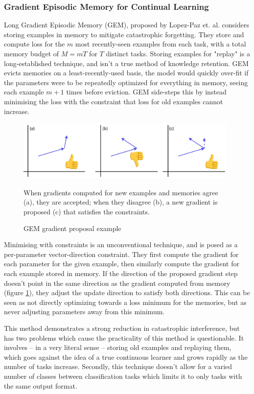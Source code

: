 \documentclass{report}
\begin{document}
	\subsubsection{Gradient Episodic Memory for Continual Learning}
	Long
	Gradient Episodic Memory (GEM), proposed by Lopez-Paz et. al. \parencite{gem} considers storing examples in memory to mitigate catastrophic forgetting. They store and compute loss for the $m$ most recently-seen examples from each task, with a total memory budget of $M=mT$ for $T$ distinct tasks. Storing examples for "replay" is a long-established technique, and isn't a true method of knowledge retention. GEM evicts memories on a least-recently-used basis, the model would quickly over-fit if the parameters were to be repeatedly optimized for everything in memory, seeing each example $m+1$ times before eviction. GEM side-steps this by instead minimising the loss with the constraint that loss for old examples cannot increase. \par
	\begin{figure}[h]
		\centering
		\includegraphics[width=11cm]{gem}
		\caption{GEM gradient proposal example}
		When gradients computed for new examples and memories agree (a), they are accepted; when they disagree (b), a new gradient is proposed (c) that satisfies the constraints.
		\label{fig:gem:1}
	\end{figure}
	Minimising with constraints is an unconventional technique, and is posed as a per-parameter vector-direction constraint. They first compute the gradient for each parameter for the given example, then similarly compute the gradient for each example stored in memory. If the direction of the proposed gradient step doesn't point in the same direction as the gradient computed from memory (figure \ref{fig:gem:1}), they adjust the update direction to satisfy both directions. This can be seen as not directly optimizing towards a loss minimum for the memories, but as never adjusting parameters away from this minimum. \par
	This method demonstrates a strong reduction in catastrophic interference, but has two problems which cause the practicality of this method is questionable. It involves -- in a very literal sense -- storing old examples and replaying them, which goes against the idea of a true continuous learner and grows rapidly as the number of tasks increase. Secondly, this technique doesn't allow for a varied number of classes between classification tasks which limits it to only tasks with the same output format. \par
	
\end{document}
